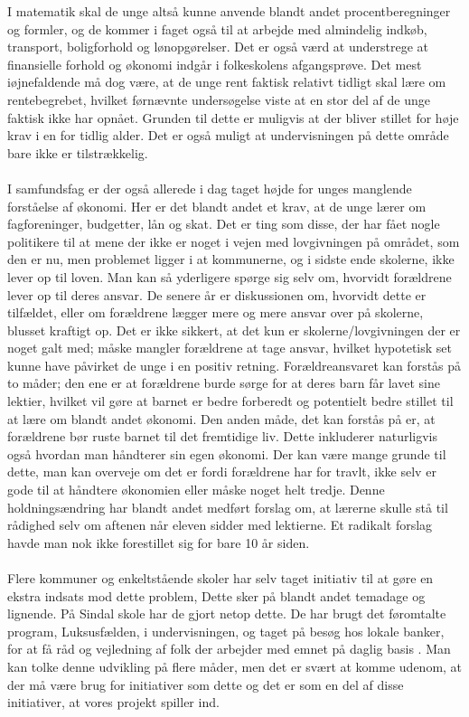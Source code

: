 I matematik skal de unge altså kunne anvende blandt andet procentberegninger og formler, og de kommer i faget også til at arbejde med almindelig indkøb, transport, boligforhold og lønopgørelser. Det er også værd at understrege at finansielle forhold og økonomi indgår i folkeskolens afgangsprøve. Det mest iøjnefaldende må dog være, at de unge rent faktisk relativt tidligt skal lære om rentebegrebet, hvilket førnævnte undersøgelse viste at en stor del af de unge faktisk ikke har opnået. Grunden til dette er muligvis at der bliver stillet for høje krav i en for tidlig alder. Det er også muligt at undervisningen på dette område bare ikke er tilstrækkelig.\\
\\
I samfundsfag er der også allerede i dag taget højde for unges manglende forståelse af økonomi. Her er det blandt andet et krav, at de unge lærer om fagforeninger, budgetter, lån og skat. Det er ting som disse, der har fået nogle politikere til at mene der ikke er noget i vejen med lovgivningen på området, som den er nu, men problemet ligger i at kommunerne, og i sidste ende skolerne, ikke lever op til loven\cite{BusinessDK3}. Man kan så yderligere spørge sig selv om, hvorvidt forældrene lever op til deres ansvar. De senere år er diskussionen om, hvorvidt dette er tilfældet, eller om forældrene lægger mere og mere ansvar over på skolerne, blusset kraftigt op. Det er ikke sikkert, at det kun er skolerne/lovgivningen der er noget galt med; måske mangler forældrene at tage ansvar, hvilket hypotetisk set kunne have påvirket de unge i en positiv retning. Forældreansvaret kan forstås på to måder; den ene er at forældrene burde sørge for at deres barn får lavet sine lektier, hvilket vil gøre at barnet er bedre forberedt og potentielt bedre stillet til at lære om blandt andet økonomi. Den anden måde, det kan forstås på er, at forældrene bør ruste barnet til det fremtidige liv. Dette inkluderer naturligvis også hvordan man håndterer sin egen økonomi. Der kan være mange grunde til dette, man kan overveje om det er fordi forældrene har for travlt, ikke selv er gode til at håndtere økonomien eller måske noget helt tredje. Denne holdningsændring har blandt andet medført forslag om, at lærerne skulle stå til rådighed selv om aftenen når eleven sidder med lektierne. Et radikalt forslag havde man nok ikke forestillet sig for bare 10 år siden\cite{ForaldreAnsvar}.\\
\\
Flere kommuner og enkeltstående skoler har selv taget initiativ til at gøre en ekstra indsats mod dette problem, Dette sker på blandt andet temadage og lignende. På Sindal skole har de gjort netop dette. De har brugt det føromtalte program, Luksusfælden, i undervisningen, og taget på besøg hos lokale banker, for at få råd og vejledning af folk der arbejder med emnet på daglig basis \cite{Sindal}. Man kan tolke denne udvikling på flere måder, men det er svært at komme udenom, at der må være brug for initiativer som dette og det er som en del af disse initiativer, at vores projekt spiller ind.\\
